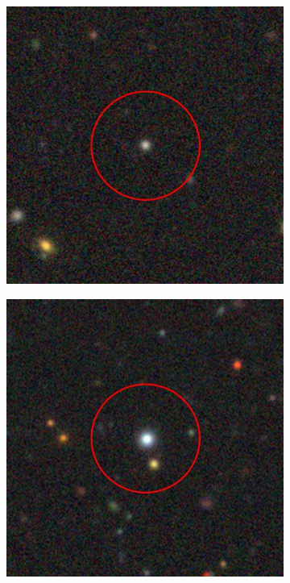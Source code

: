 \begin{figure}[!ht]
    \centering
    \captionsetup{justification=centering}
    \begin{subfigure}[b]{0.3\textwidth}
        \includegraphics[width=\textwidth]{Images/ucds_exp/UCD_M60.png}
        \caption{}
    \end{subfigure}
    \begin{subfigure}[b]{0.3\textwidth}
        \includegraphics[width=\textwidth]{Images/ucds_exp/UCD_M87.png}

\end{subfigure}
\end{figure}
